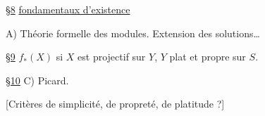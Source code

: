 \uline{\S8}    \uline{fondamentaux d'existence}

A) Théorie formelle des modules. Extension des solutions\ldots

\uline{\S9}  $f_*(X)$ si $X$ est projectif sur $Y$, $Y$ plat et propre sur $S$.

\uline{\S10} C) Picard.

[Critères de simplicité, de propreté, de platitude ?]
